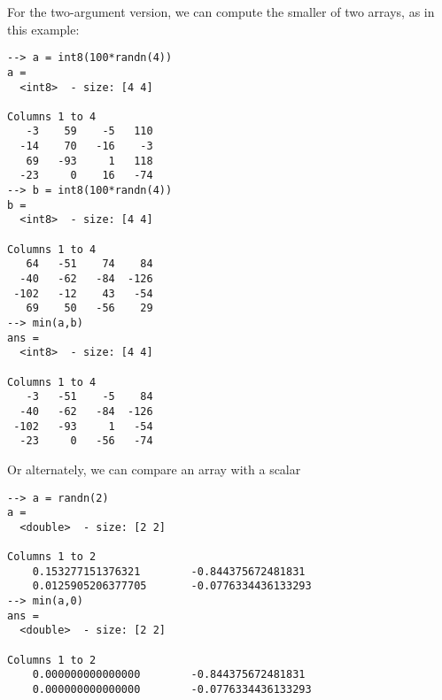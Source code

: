 For the two-argument version, we can compute the smaller of two arrays,
as in this example:
\begin{verbatim}
--> a = int8(100*randn(4))
a =
  <int8>  - size: [4 4]

Columns 1 to 4
   -3    59    -5   110
  -14    70   -16    -3
   69   -93     1   118
  -23     0    16   -74
--> b = int8(100*randn(4))
b =
  <int8>  - size: [4 4]

Columns 1 to 4
   64   -51    74    84
  -40   -62   -84  -126
 -102   -12    43   -54
   69    50   -56    29
--> min(a,b)
ans =
  <int8>  - size: [4 4]

Columns 1 to 4
   -3   -51    -5    84
  -40   -62   -84  -126
 -102   -93     1   -54
  -23     0   -56   -74
\end{verbatim}
Or alternately, we can compare an array with a scalar
\begin{verbatim}
--> a = randn(2)
a =
  <double>  - size: [2 2]

Columns 1 to 2
    0.153277151376321        -0.844375672481831
    0.0125905206377705       -0.0776334436133293
--> min(a,0)
ans =
  <double>  - size: [2 2]

Columns 1 to 2
    0.000000000000000        -0.844375672481831
    0.000000000000000        -0.0776334436133293
\end{verbatim}
